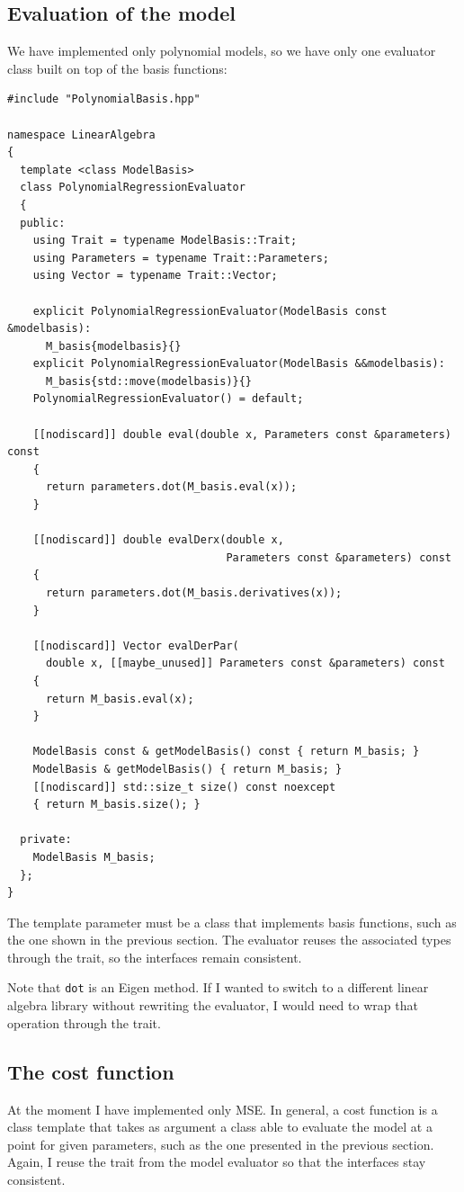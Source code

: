 \documentclass{article}
\newcommand{\li}{\lstinline}
\begin{document}
\subsection{Evaluation of the model}
We have implemented only polynomial models, so we have only one evaluator class built on top of the basis functions:
\begin{lstlisting}[title={PolynomialRegressionEvaluator.hpp}]
#include "PolynomialBasis.hpp"

namespace LinearAlgebra
{
  template <class ModelBasis>
  class PolynomialRegressionEvaluator
  {
  public:
    using Trait = typename ModelBasis::Trait;
    using Parameters = typename Trait::Parameters;
    using Vector = typename Trait::Vector;

    explicit PolynomialRegressionEvaluator(ModelBasis const &modelbasis):
      M_basis{modelbasis}{}
    explicit PolynomialRegressionEvaluator(ModelBasis &&modelbasis):
      M_basis{std::move(modelbasis)}{}
    PolynomialRegressionEvaluator() = default;

    [[nodiscard]] double eval(double x, Parameters const &parameters) const
    {
      return parameters.dot(M_basis.eval(x));
    }

    [[nodiscard]] double evalDerx(double x,
                                  Parameters const &parameters) const
    {
      return parameters.dot(M_basis.derivatives(x));
    }

    [[nodiscard]] Vector evalDerPar(
      double x, [[maybe_unused]] Parameters const &parameters) const
    {
      return M_basis.eval(x);
    }

    ModelBasis const & getModelBasis() const { return M_basis; }
    ModelBasis & getModelBasis() { return M_basis; }
    [[nodiscard]] std::size_t size() const noexcept
    { return M_basis.size(); }

  private:
    ModelBasis M_basis;
  };
}
\end{lstlisting}

The template parameter must be a class that implements basis functions, such as the one shown in the previous section. The evaluator reuses the associated types through the trait, so the interfaces remain consistent.

Note that \li!dot! is an Eigen method. If I wanted to switch to a different linear algebra library without rewriting the evaluator, I would need to wrap that operation through the trait.

\subsection{The cost function}
At the moment I have implemented only MSE. In general, a cost function is a class template that takes as argument a class able to evaluate the model at a point for given parameters, such as the one presented in the previous section. Again, I reuse the trait from the model evaluator so that the interfaces stay consistent.
\end{document}
